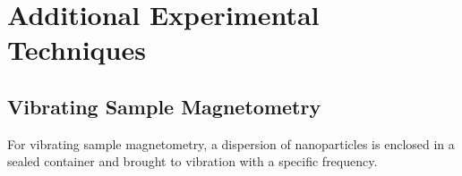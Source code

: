 \documentclass[\main/dresen_thesis.tex]{subfiles}
\begin{document}
\chapter{Additional Experimental Techniques}
\section{Vibrating Sample Magnetometry}
\label{app:additionalExperimentalTechniques:vsm}
For vibrating sample magnetometry, a dispersion of nanoparticles is enclosed in a sealed container and brought to vibration with a specific frequency.
\end{document}
